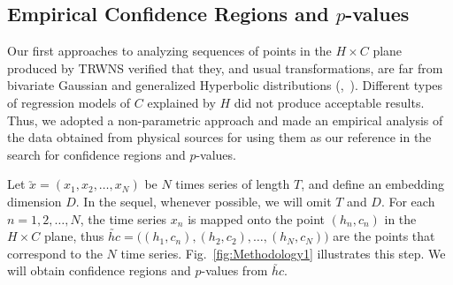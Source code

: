 \documentclass[alpha-refs]{wiley-article}
\newcommand{\Mycite}[1]{%
(\citeauthor{#1},~\citeyear{#1})}
\begin{document}
\subsection{Empirical Confidence Regions and $p$-values}\label{confidenceRegions}


Our first approaches to analyzing sequences of points in the $H\times C$ plane produced by TRWNS verified that they, and usual transformations, are far from bivariate Gaussian and generalized Hyperbolic distributions \Mycite{MultivariateDistributionModelswithGeneralizedHyperbolicMargins}.
Different types of regression models of $C$ explained by $H$ did not produce acceptable results.
Thus, we adopted a non-parametric approach and made an empirical analysis of the data obtained from physical sources for using them as our reference in the search for confidence regions and $p$-values.


Let $\utilde{x} =(x_1, x_2, \dots, x_N)$ be $N$ times series of length $T$, and define an embedding dimension $D$.
In the sequel, whenever possible, we will omit $T$ and $D$.
For each $n=1,2,\dots, N$, the time series $x_n$ is mapped onto the point $(h_n,c_n)$ in the $H\times C$ plane, thus $\utilde{hc}=\big((h_1,c_n), (h_2,c_2), \dots, (h_N,c_N)\big)$ are the points that correspond to the $N$ time series.
Fig.~\ref{fig:Methodology1} illustrates this step.
We will obtain confidence regions and $p$-values from $\utilde{hc}$.
\end{document}
